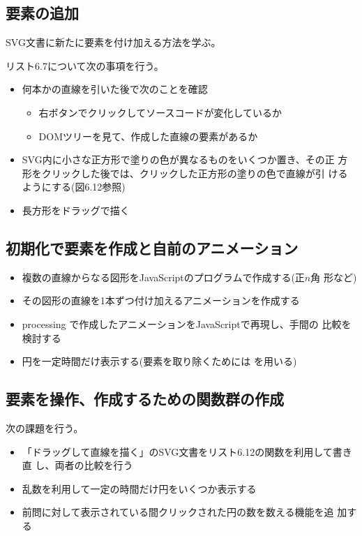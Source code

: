 \documentclass[a4j]{jarticle}
\begin{document}
\subsection{要素の追加}
SVG文書に新たに要素を付け加える方法を学ぶ。

リスト6.7について次の事項を行う。
 \begin{itemize}
   \item 何本かの直線を引いた後で次のことを確認
  \begin{itemize}
  \item 右ボタンでクリックしてソースコードが変化しているか
   \item DOMツリーを見て、作成した直線の要素があるか
  \end{itemize}
	\item SVG内に小さな正方形で塗りの色が異なるものをいくつか置き、その正
				方形をクリックした後では、クリックした正方形の塗りの色で直線が引
				けるようにする(図6.12参照)
	\item 長方形をドラッグで描く
 \end{itemize}
  \subsection{初期化で要素を作成と自前のアニメーション}
 \begin{itemize}
  \item 複数の直線からなる図形をJavaScriptのプログラムで作成する(正$n$角
        形など)
  \item その図形の直線を1本ずつ付け加えるアニメーションを作成する
  \item processing で作成したアニメーションをJavaScriptで再現し、手間の
        比較を検討する
  \item 円を一定時間だけ表示する(要素を取り除くためには
        を用いる)
 \end{itemize}
 \subsection{要素を操作、作成するための関数群の作成}
 次の課題を行う。
 \begin{itemize}
  \item 「ドラッグして直線を描く」のSVG文書をリスト6.12の関数を利用して書き直
        し、両者の比較を行う
  \item 乱数を利用して一定の時間だけ円をいくつか表示する
  \item 前問に対して表示されている間クリックされた円の数を数える機能を追
        加する
 \end{itemize}
\end{document}
